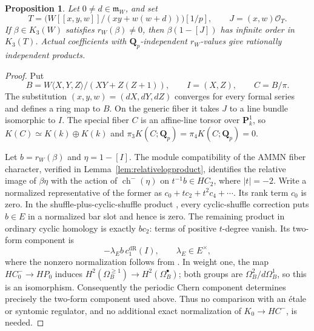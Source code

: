 \documentclass[11pt,a4paper]{article}
\newtheorem{proposition}[theorem]{Proposition}
\theoremstyle{remark}
\begin{document}
\begin{proposition}\label{prop:directtccoefficientcup}
Let $0\ne d\in\mathfrak m_W$, and set
\[
 T=\bigl(W[[x,y,w]]/(xy+w(w+d))\bigr)[1/p],\qquad J=(x,w)\mathcal O_T.
\]
If $\beta\in K_3(W)$ satisfies $r_W(\beta)\ne0$, then
$\beta(1-[J])$ has infinite order in $K_3(T)$. Actual coefficients
with $\mathbf Q_p$-independent $r_W$-values give rationally independent
products.
\end{proposition}
\begin{proof}
Put
\[
 B=W\langle X,Y,Z\rangle/(XY+Z(Z+1)),\qquad I=(X,Z),\qquad C=B/\pi.
\]
The substitution $(x,y,w)=(dX,dY,dZ)$ converges for every formal
series and defines a ring map to $B$. On the generic fiber it takes
$J$ to a line bundle isomorphic to $I$. The special fiber $C$ is an
affine-line torsor over $\mathbf P^1_k$, so
$K(C)\simeq K(k)\oplus K(k)$ and
$\pi_3K(C;\mathbf Q_p)=\pi_4K(C;\mathbf Q_p)=0$.

Let $b=r_W(\beta)$ and $\eta=1-[I]$. The module compatibility of the
AMMN fiber character, verified in Lemma~\ref{lem:relativelogproduct},
identifies the relative image of $\beta\eta$ with the action of
$\operatorname{ch}^{-}(\eta)$ on $t^{-1}b\in HC_2$, where $|t|=-2$.
Write a normalized representative of the former as
$c_0+tc_2+t^2c_4+\cdots$. Its rank term $c_0$ is zero. In the
shuffle-plus-cyclic-shuffle product
\cite[Section~2, Remark~2.2]{BokstedtOttosen}, every cyclic-shuffle
correction puts $b\in E$ in a normalized bar slot and hence is zero.
The remaining product in ordinary cyclic homology is exactly $bc_2$:
terms of positive $t$-degree vanish. Its two-form component is
\[
 -\lambda_E b\,c_1^{\mathrm{dR}}(I),\qquad\lambda_E\in E^\times,
\]
where the nonzero normalization follows from
\cite[Proposition~4.12]{AMMN}. In weight one, the map
$HC^-_0\to HP_0$ induces
$H^2(\Omega_B^{\geq1})\to H^2(\Omega_B^\bullet)$; both groups
are $\Omega_B^2/d\Omega_B^1$, so this is an isomorphism.
Consequently the periodic Chern component determines precisely the
two-form component used above. Thus no comparison with an \'etale
or syntomic regulator, and no additional exact normalization of
$K_0\to HC^{-}$, is needed.


\end{proof}
\end{document}
